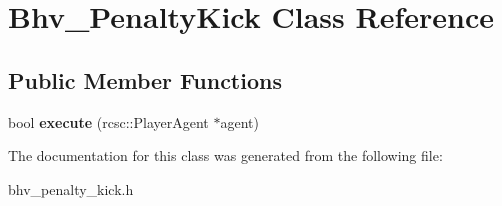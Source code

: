\hypertarget{classBhv__PenaltyKick}{
\section{Bhv\_\-PenaltyKick Class Reference}
\label{classBhv__PenaltyKick}
}
\subsection*{Public Member Functions}
\begin{DoxyCompactItemize}
\item 
\hypertarget{classBhv__PenaltyKick_a1ea2396eeeeae555938e562cd90687f8}{
bool {\bfseries execute} (rcsc::PlayerAgent $\ast$agent)}
\label{classBhv__PenaltyKick_a1ea2396eeeeae555938e562cd90687f8}

\end{DoxyCompactItemize}


The documentation for this class was generated from the following file:\begin{DoxyCompactItemize}
\item 
bhv\_\-penalty\_\-kick.h\end{DoxyCompactItemize}
